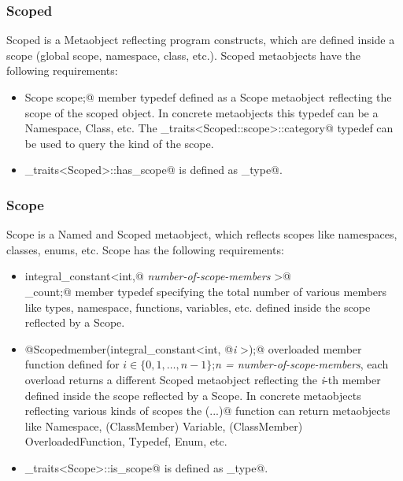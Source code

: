 \subsubsection{Scoped}

{\metaobject Scoped} is a {\metaobject Metaobject} reflecting program constructs,
which are defined inside a scope (global scope, namespace, class, etc.). {\metaobject Scoped}
metaobjects have the following requirements:

\begin{itemize}
	\item{\verb@typedef Scope scope;@} member typedef defined as
	a {\metaobject Scope} metaobject reflecting the scope of the scoped object.
	In concrete metaobjects this typedef can be a {\metaobject Namespace}, {\metaobject Class},
	etc. The \verb@metaobject_traits<Scoped::scope>::category@ typedef can be used to
	query the kind of the scope.

	\item \verb@metaobject_traits<Scoped>::has_scope@ is defined as \verb@true_type@.
\end{itemize}

\subsubsection{Scope}

{\metaobject Scope} is a {\metaobject Named} and {\metaobject Scoped} metaobject,
which reflects scopes like namespaces, classes, enums, etc. {\metaobject Scope}
has the following requirements:

\begin{itemize}

	\item{\verb@typedef integral_constant<int,@ {\em number-of-scope-members}
	\verb@>@\\\verb@member_count;@} member typedef specifying the total number
	of various members like types, namespace, functions, variables, etc. defined inside
	the scope reflected by a {\metaobject Scope}.

	\item{\verb@static @{\metaobject Scoped}\verb@ member(integral_constant<int, @{\em i}
	\verb@>);@} overloaded member function defined
	for $i \in \{0, 1, \dots, n-1\}$;{\em n = number-of-scope-members},
	each overload returns a different {\metaobject Scoped} metaobject reflecting the {\em i}-th member
	defined inside the scope reflected by a {\metaobject Scope}.
	In concrete metaobjects reflecting various kinds of scopes the \verb@member(...)@ function
	can return metaobjects like {\metaobject Namespace}, ({\metaobject ClassMember}) {\metaobject Variable},
	({\metaobject ClassMember}) {\metaobject OverloadedFunction}, {\metaobject Typedef},
	{\metaobject Enum}, etc.

	\item \verb@metaobject_traits<Scope>::is_scope@ is defined as \verb@true_type@.
\end{itemize}

